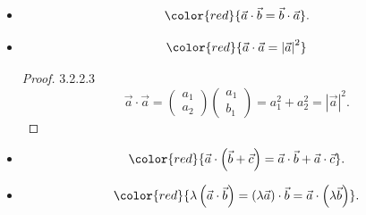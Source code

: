 \documentclass[12pt, a4paper]{article}
\begin{document}
\begin{enumerate}
\begin{itemize}
\begin{proof}{3.2.2.2}{}
      OR $\vec{a}\cdot\vec{b}=-\left|\vec{a}\right|\left|\vec{b}\right|$ for $\vec{a}$ and $\vec{b}$ at opposite directions. 
    \end{proof}
    \item $${\color{red}{\vec{a}\cdot\vec{b}=\vec{b}\cdot\vec{a}}}.$$
    \item $${\color{red}{\vec{a}\cdot\vec{a}=\left|\vec{a}\right|^2}}$$
    \begin{proof}{3.2.2.3}{}
      $$\vec{a}\cdot\vec{a}=\begin{pmatrix}a_1\\a_2\end{pmatrix}\begin{pmatrix}a_1\\b_1\end{pmatrix}=a_1^2+a_2^2=\left|\vec{a}\right|^2.$$
    \end{proof}
    \item $${\color{red}{\vec{a}\cdot\left(\vec{b}+\vec{c}\right)=\vec{a}\cdot\vec{b}+\vec{a}\cdot\vec{c}}}.$$
    \item $${\color{red}{\lambda\left(\vec{a}\cdot\vec{b}\right)=\left(\lambda\vec{a}\right)\cdot\vec{b}=\vec{a}\cdot\left(\lambda\vec{b}\right)}}.$$
  \end{itemize}
\end{enumerate}
\end{document}
